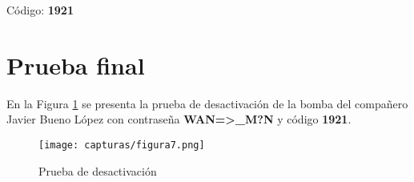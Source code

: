 Código: \textbf{1921}


\section{Prueba final}

En la Figura \ref{fig:figura7} se presenta la prueba de desactivación de la bomba del compañero Javier Bueno López con contraseña \textbf{WAN=>\_M?N} y código \textbf{1921}.

\begin{figure}[H]
	\centering
	\texttt{[image: capturas/figura7.png]} 
	\caption{Prueba de desactivación} 
	\label{fig:figura7}
\end{figure}




